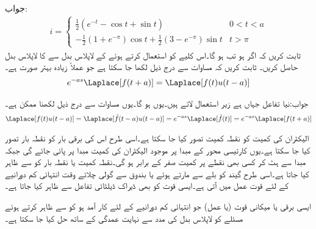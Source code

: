 جواب:
\begin{align*}
i=
\begin{cases}
\tfrac{1}{2}(e^{-t}-\cos t+\sin t) & 0<t<a\\
-\tfrac{1}{2}(1+e^{-\pi})\cos t+\tfrac{1}{2}(3-e^{-\pi})\sin t& t>\pi
\end{cases}
\end{align*}
ثابت کریں کہ اگر  ہو تب  ہو گا۔اس کلیے کو استعمال کرتے ہوئے  کے لاپلاس بدل سے  کا لاپلاس بدل حاصل کریں۔
ثابت کریں کہ مساوات  سے درج ذیل لکھا جا سکتا ہے جو عملاً زیادہ بہتر صورت ہے۔
\begin{align}
e^{-as}\Laplace[f(t+a)]=\Laplace[f(t)u(t-a)]
\end{align}

جواب:نیا تفاعل  جہاں  ہے زیر استعمال لاتے ہیں۔یوں  ہو گا۔یوں مساوات  سے درج ذیل لکھنا ممکن ہے۔
\begin{align*}
\Laplace[f(t)u(t-a)]=\Laplace[\tilde{f}(t-a)u(t-a)]=e^{-as}\Laplace[\tilde{f}(t)]=e^{-as}\Laplace[f(t+a)]
\end{align*}


الیکٹران کی کمیت کو نقطہ کمیت تصور کیا جا سکتا ہے۔اسی طرح اس کی برقی بار کو نقطہ بار تصور کیا جا سکتا ہے۔یوں کارتیسی محور کے مبدا پر موجود الیکٹران کی کمیت مبدا پر پائی جائے گی جبکہ مبدا سے ہٹ کر کسی بھی نقطے پر کمیت صفر کے برابر ہو گی۔نقطہ کمیت یا نقطہ بار کو  سے ظاہر کیا جاتا ہے۔اسی طرح گیند کو بلے سے مارتے ہوئے یا بندوق سے گولی چلاتے وقت  انتہائی کم دورانیے کے لئے قوت عمل میں آتی ہے۔ایسی قوت کو بھی ڈیراک ڈیلٹائی تفاعل سے ظاہر کیا جاتا ہے۔

ایسی برقی یا میکانی قوت (یا عمل) جو انتہائی کم دورانیے کے لئے کار آمد ہو کو  سے ظاہر کرتے ہوئے  مسئلے کو لاپلاس بدل کی مدد سے نہایت عمدگی کے ساتھ حل کیا جا سکتا ہے۔

